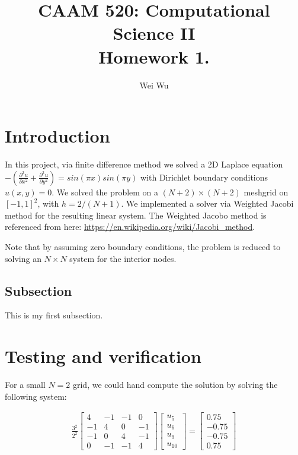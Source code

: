 \documentclass{amsart} %
\title{CAAM 520: Computational Science II \\
Homework 1.}
\author{Wei Wu}
\begin{document}

\maketitle

\section{Introduction} 
In this project, via finite difference method we solved a 2D Laplace equation $-(\frac{\partial^2 u}{\partial x^2} + \frac{\partial^2 u}{\partial y^2}) = sin(\pi x)sin(\pi y)$ with Dirichlet boundary conditions $u(x,y) = 0$. We solved the problem on a $(N + 2) \times (N + 2)$ meshgrid on $[-1,1]^2$, with $h = 2/(N+1)$. We implemented a solver via Weighted Jacobi method for the resulting linear system. The Weighted Jacobo method is referenced from here:  \url{https://en.wikipedia.org/wiki/Jacobi_method}. 

Note that by assuming zero boundary conditions, the problem is reduced to solving an $N \times N$ system for the interior nodes.   


\subsection{Subsection}
This is my first subsection.


\section{Testing and verification}
For a small $N = 2$ grid, we could hand compute the solution by solving the following system:

\begin{gather}
\frac{3^2}{2^2}
\begin{bmatrix} 4 & -1 & -1 & 0 \\ -1 & 4 & 0 & -1\\
				-1 & 0 & 4 & -1  \\ 0 & -1 & -1 & 4
 \end{bmatrix}
 \begin{bmatrix} u_5 \\ u_6 \\ u_9 \\ u_{10} \end{bmatrix}
=
\begin{bmatrix}
0.75 \\ -0.75 \\ -0.75 \\ 0.75
\end{bmatrix}
\end{gather}
\end{document}
